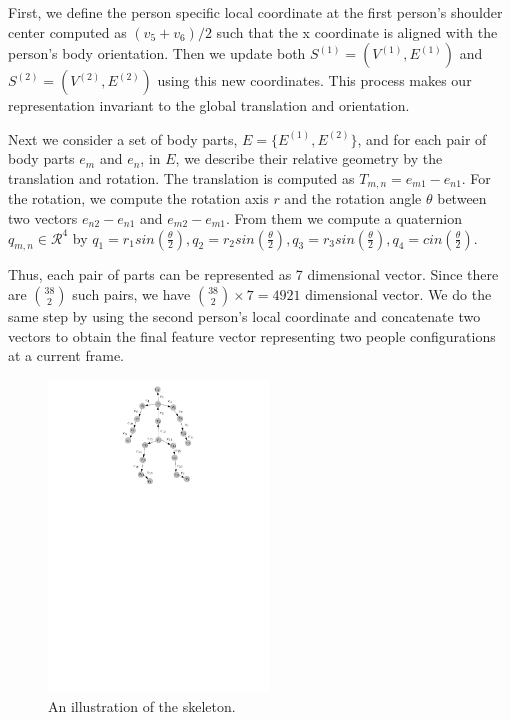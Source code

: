 \documentclass[10pt,twocolumn,letterpaper]{article}
\begin{document}
First, we define the person specific local coordinate at the first person's shoulder center computed as $(v_5 + v_6)/2$ such that the x coordinate is aligned with the person's body orientation. Then we update both $S^{(1)}=(V^{(1)},E^{(1)})$ and $S^{(2)}=(V^{(2)},E^{(2)})$ using this new coordinates. This process makes our representation invariant to the global translation and orientation. 

Next we consider a set of body parts, $E=\{E^{(1)},E^{(2)}\}$, and for each pair of body parts $e_m$ and $e_n$, in $E$, we describe their relative geometry by the translation and rotation. The translation is computed as $T_{m,n}=e_{m1}-e_{n1}$. For the rotation, we compute the rotation axis $r$ and the rotation angle $\theta$ between two vectors $e_{n2}-e_{n1}$ and $e_{m2}-e_{m1}$. From them we compute a quaternion $q_{m,n} \in \mathcal{R}^4$ by $q_1=r_1 sin( \frac{\theta}{2} ), q_2=r_2 sin( \frac{\theta}{2} ), q_3=r_3 sin( \frac{\theta}{2}), q_4=cin( \frac{\theta}{2})$.

Thus, each pair of parts can be represented as 7 dimensional vector. Since there are $\binom{38}{2}$ such pairs, we have $\binom{38}{2} \times 7 = 4921$ dimensional vector. We do the same step by using the second person's local coordinate and concatenate two vectors to obtain the final feature vector representing two people configurations at a current frame.

\begin{figure}[htb]
\begin{center}
\includegraphics[width=2.3in]{skeleton.pdf}
\caption{An illustration of the skeleton. \label{fig:skeleton}}
\end{center}
\end{figure}
\end{document}

